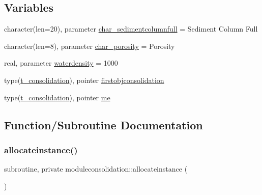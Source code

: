 \subsection*{Variables}
\begin{DoxyCompactItemize}
\item 
character(len=20), parameter \mbox{\hyperlink{namespacemoduleconsolidation_a2a32335f2940d1ba0a8488797e504295}{char\+\_\+sedimentcolumnfull}} = \textquotesingle{}Sediment Column Full\textquotesingle{}
\item 
character(len=8), parameter \mbox{\hyperlink{namespacemoduleconsolidation_a5c123194ad718ebaf0fe7466ca4d7c82}{char\+\_\+porosity}} = \textquotesingle{}Porosity\textquotesingle{}
\item 
real, parameter \mbox{\hyperlink{namespacemoduleconsolidation_ae2d4a16a8d18816c8bb53007d7ec0634}{waterdensity}} = 1000
\item 
type(\mbox{\hyperlink{structmoduleconsolidation_1_1t__consolidation}{t\+\_\+consolidation}}), pointer \mbox{\hyperlink{namespacemoduleconsolidation_abf614f867a201723e44b18315fa3223d}{firstobjconsolidation}}
\item 
type(\mbox{\hyperlink{structmoduleconsolidation_1_1t__consolidation}{t\+\_\+consolidation}}), pointer \mbox{\hyperlink{namespacemoduleconsolidation_a6a9ef6cb5eb83e8fa553110a7afca22b}{me}}
\end{DoxyCompactItemize}


\subsection{Function/\+Subroutine Documentation}
\mbox{\label{namespacemoduleconsolidation_ab891ed95a8328cd00b80d32b5bbc6bb6}} 
\subsubsection{\texorpdfstring{allocateinstance()}{allocateinstance()}}
{\footnotesize\ttfamily subroutine, private moduleconsolidation\+::allocateinstance (\begin{DoxyParamCaption}{ }\end{DoxyParamCaption})\hspace{0.3cm}{\ttfamily [private]}}

